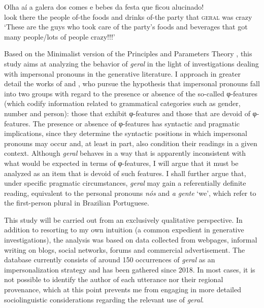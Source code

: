 \documentclass[output=paper]{langscibook}
\begin{document}
 \ex\label{ex:avelar:1d}
  \gll Olha aí a galera dos comes e bebes da festa que  ficou   alucinado! %
  \\
         look there   the people   of-the foods   and drinks   of-the   party   that \textsc{geral} was crazy\\
  \glt ‘These are the guys who took care of the party’s foods and beverages that got many people/lots of people crazy!!!’
\z 
\z\largerpage

\begin{sloppypar}
Based on the Minimalist version of the Principles and Parameters Theory \citep{Chomsky1995}, this study aims at analyzing the behavior of \textit{geral} in the light of investigations dealing with impersonal pronouns in the generative literature. I approach in greater detail the works of \citet{Egerland2003} and \citet{Fenger2018}, who pursue the hypothesis that impersonal pronouns fall into two groups with regard to the presence or absence of the so-called φ-fea\-tures (which codify information related to grammatical categories such as gender, number and person): those that exhibit φ-fea\-tures and those that are devoid of φ-fea\-tures. The presence or absence of φ-fea\-tures has syntactic and pragmatic implications, since they determine the syntactic positions in which impersonal pronouns may occur and, at least in part, also condition their readings in a given context. Although \textit{geral} behaves in a way that is apparently inconsistent with what would be expected in terms of φ-fea\-tures, I will argue that it must be analyzed as an item that is devoid of such features. I shall further argue that, under specific pragmatic circumstances, \textit{geral} may gain a referentially definite reading, equivalent to the personal pronouns \textit{nós} and \textit{a gente} ‘we’, which refer to the first-person plural in Brazilian Portuguese.
\end{sloppypar}

This study will be carried out from an exclusively qualitative perspective. In addition to resorting to my own intuition (a common expedient in generative investigations), the analysis was based on data collected from webpages, informal writing on blogs, social networks, forums and commercial advertisement. The database currently consists of around 150 occurrences of \textit{geral} as an impersonalization strategy and has been gathered since 2018. In most cases, it is not possible to identify the author of each utterance nor their regional provenance, which at this point prevents me from engaging in more detailed sociolinguistic considerations regarding the relevant use of \textit{geral}.
\end{document}
